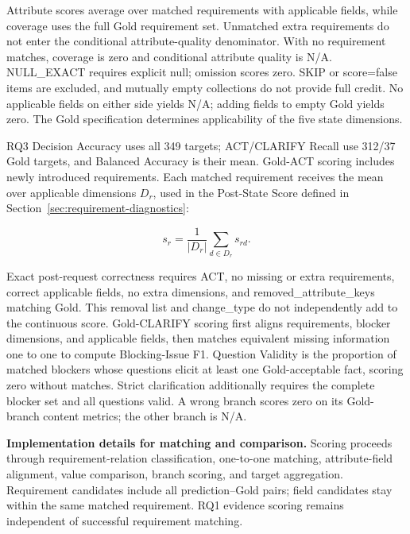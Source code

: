 \documentclass{article} %
\begin{document}
Attribute scores average over matched requirements with applicable fields, while coverage uses the full Gold requirement set. Unmatched extra requirements do not enter the conditional attribute-quality denominator. With no requirement matches, coverage is zero and conditional attribute quality is N/A. NULL\_EXACT requires explicit null; omission scores zero. SKIP or score=false items are excluded, and mutually empty collections do not provide full credit. No applicable fields on either side yields N/A; adding fields to empty Gold yields zero. The Gold specification determines applicability of the five state dimensions.

RQ3 Decision Accuracy uses all 349 targets; ACT/CLARIFY Recall use 312/37 Gold targets, and Balanced Accuracy is their mean. Gold-ACT scoring includes newly introduced requirements. Each matched requirement receives the mean over applicable dimensions $D_r$, used in the Post-State Score defined in Section~\ref{sec:requirement-diagnostics}:

\begin{equation}
s_r=\frac{1}{|D_r|}\sum_{d\in D_r}s_{rd}.
\label{eq:state-dimension-mean}
\end{equation}

Exact post-request correctness requires ACT, no missing or extra requirements, correct applicable fields, no extra dimensions, and removed\_attribute\_keys matching Gold. This removal list and change\_type do not independently add to the continuous score. Gold-CLARIFY scoring first aligns requirements, blocker dimensions, and applicable fields, then matches equivalent missing information one to one to compute Blocking-Issue F1. Question Validity is the proportion of matched blockers whose questions elicit at least one Gold-acceptable fact, scoring zero without matches. Strict clarification additionally requires the complete blocker set and all questions valid. A wrong branch scores zero on its Gold-branch content metrics; the other branch is N/A.

\textbf{Implementation details for matching and comparison.} Scoring proceeds through requirement-relation classification, one-to-one matching, attribute-field alignment, value comparison, branch scoring, and target aggregation. Requirement candidates include all prediction--Gold pairs; field candidates stay within the same matched requirement. RQ1 evidence scoring remains independent of successful requirement matching.
\end{document}
